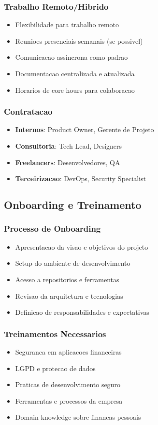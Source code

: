 \subsubsection{Trabalho Remoto/Hibrido}
\begin{itemize}
    \item Flexibilidade para trabalho remoto
    \item Reunioes presenciais semanais (se possivel)
    \item Comunicacao assincrona como padrao
    \item Documentacao centralizada e atualizada
    \item Horarios de core hours para colaboracao
\end{itemize}

\subsubsection{Contratacao}
\begin{itemize}
    \item \textbf{Internos}: Product Owner, Gerente de Projeto
    \item \textbf{Consultoria}: Tech Lead, Designers
    \item \textbf{Freelancers}: Desenvolvedores, QA
    \item \textbf{Terceirizacao}: DevOps, Security Specialist
\end{itemize}

\subsection{Onboarding e Treinamento}

\subsubsection{Processo de Onboarding}
\begin{itemize}
    \item Apresentacao da visao e objetivos do projeto
    \item Setup do ambiente de desenvolvimento
    \item Acesso a repositorios e ferramentas
    \item Revisao da arquitetura e tecnologias
    \item Definicao de responsabilidades e expectativas
\end{itemize}

\subsubsection{Treinamentos Necessarios}
\begin{itemize}
    \item Seguranca em aplicacoes financeiras
    \item LGPD e protecao de dados
    \item Praticas de desenvolvimento seguro
    \item Ferramentas e processos da empresa
    \item Domain knowledge sobre financas pessoais
\end{itemize}

